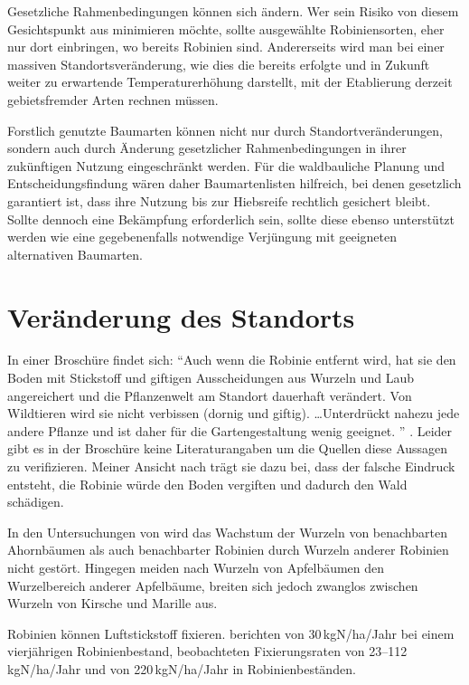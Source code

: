 \documentclass[twocolumn]{scrartcl}
\begin{document}
Gesetzliche Rahmenbedingungen können sich ändern. Wer sein Risiko von diesem
Gesichtspunkt aus minimieren möchte, sollte ausgewählte Robiniensorten, eher nur
dort einbringen, wo bereits Robinien sind. Andererseits wird man bei einer
massiven Standortsveränderung, wie dies die bereits erfolgte und in Zukunft
weiter zu erwartende Temperaturerhöhung darstellt, mit der Etablierung derzeit
gebietsfremder Arten rechnen müssen.

Forstlich genutzte Baumarten können nicht nur durch Standortveränderungen,
sondern auch durch Änderung gesetzlicher Rahmenbedingungen in ihrer zukünftigen
Nutzung eingeschränkt werden. Für die waldbauliche Planung und
Entscheidungsfindung wären daher Baumartenlisten hilfreich, bei denen gesetzlich
garantiert ist, dass ihre Nutzung bis zur Hiebsreife rechtlich gesichert bleibt.
Sollte dennoch eine Bekämpfung erforderlich sein, sollte diese ebenso
unterstützt werden wie eine gegebenenfalls notwendige Verjüngung mit geeigneten
alternativen Baumarten.

\section{Veränderung des Standorts}

In einer Broschüre findet sich: \enquote{Auch wenn die Robinie entfernt wird,
hat sie den Boden mit Stickstoff und giftigen Ausscheidungen aus Wurzeln und
Laub angereichert und die Pflanzenwelt am Standort dauerhaft verändert. Von
Wildtieren wird sie nicht verbissen (dornig und giftig). \dots Unterdrückt
nahezu jede andere Pflanze und ist daher für die Gartengestaltung wenig
geeignet.%
} \citep{oebf2019aliensAusDemGarten}. Leider gibt es in der Broschüre keine
Literaturangaben um die Quellen diese Aussagen zu verifizieren. Meiner Ansicht
nach trägt sie dazu bei, dass der falsche Eindruck entsteht, die Robinie würde
den Boden vergiften und dadurch den Wald schädigen.

In den Untersuchungen von
\citet[S.~150--160]{scamoni1952robinieWurzeln} wird das Wachstum der
Wurzeln von benachbarten Ahornbäumen als auch benachbarter Robinien
durch Wurzeln anderer Robinien nicht gestört. Hingegen meiden nach
\citet[S.~53]{kolesnikov1971wurzeln} Wurzeln von Apfelbäumen den
Wurzelbereich anderer Apfelbäume, breiten sich jedoch zwanglos
zwischen Wurzeln von Kirsche und Marille aus.

Robinien können Luftstickstoff fixieren.
\cite{boring1984robinieN} berichten von 30\,kgN/ha/Jahr bei einem
vierjährigen Robinienbestand, \cite{noh2009robinieN} beobachteten
Fixierungsraten von 23--112\,kgN/ha/Jahr und \cite{danso1995robinieN}
von 220\,kgN/ha/Jahr in Robinienbeständen.
\end{document}
